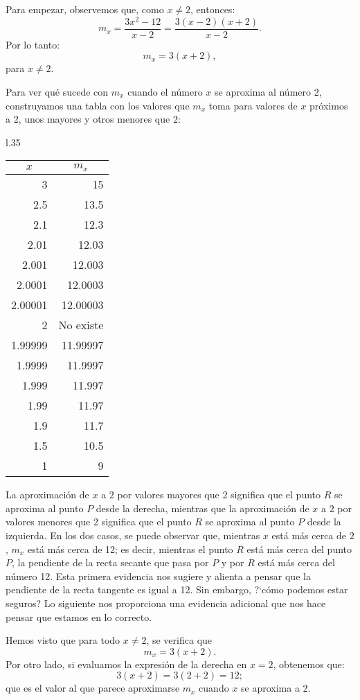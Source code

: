 Para empezar, observemos que, como $x\neq 2$, entonces:
\[
m_x = \frac{3x^2 - 12}{x - 2} = \frac{3(x - 2)(x + 2)}{x - 2}.
\]
Por lo tanto:
\[
m_x = 3(x + 2),
\]
para $x\neq 2$.

Para ver qué sucede con $m_x$ cuando el número $x$ se aproxima al número 2, construyamos una tabla
con los valores que $m_x$ toma para valores de $x$ próximos a 2, unos mayores y otros menores que
2:

\begin{wrapfigure}[19]{l}{.35\textwidth}
\centering
\begin{tabular}{|r|r|}\hline
\multicolumn{1}{|c|}{$x$} & \multicolumn{1}{c|}{$m_x$}\\\hline%
3 & 15 \\
2.5 & 13.5 \\
2.1 & 12.3 \\
2.01 & 12.03 \\
2.001 & 12.003 \\
2.0001 & 12.0003 \\
2.00001 & 12.00003 \\
2 & \multicolumn{1}{c|}{No existe} \\
1.99999 & 11.99997 \\
1.9999 & 11.9997 \\
1.999 & 11.997 \\
1.99 & 11.97 \\
1.9 & 11.7 \\
1.5 & 10.5 \\
1 & 9 \\ \hline
\end{tabular}
\end{wrapfigure}
La aproximación de $x$ a $2$ por valores mayores que 2 significa que el punto $R$ se aproxima al
punto $P$ desde la derecha, mientras que la aproximación de $x$ a 2 por valores menores que 2
significa que el punto $R$ se aproxima al punto $P$ desde la izquierda. En los dos casos, se puede
observar que, mientras $x$ está más cerca de $2$, $m_x$ está más cerca de 12; es decir, mientras el
punto $R$ está más cerca del punto $P$, la pendiente de la recta secante que pasa por $P$ y por $R$
está más cerca del número 12. Esta primera evidencia nos sugiere y alienta a pensar que la
pendiente de la recta tangente es igual a 12. Sin embargo, ?`cómo podemos estar seguros? Lo
siguiente nos proporciona una evidencia adicional que nos hace pensar que estamos en lo correcto.

Hemos visto que para todo $x\neq 2$, se verifica que
\[
m_x = 3(x + 2).
\]
Por otro lado, si evaluamos la expresión de la derecha en $x = 2$, obtenemos que:
\[
3(x + 2) = 3(2 + 2) = 12;
\]
que es el valor al que parece aproximarse $m_x$ cuando $x$ se aproxima a $2$.

